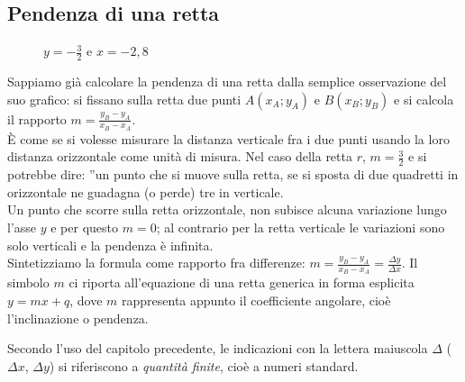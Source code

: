 \subsection{Pendenza di una retta}
\label{subsec:diff01_pendretta}

\begin{figure}[h]
\begin{inaccessibleblock}
 \begin{center}
 \begin{minipage}[]{.31 \textwidth}
  \rettadueterzi
  \caption{$y=\frac{3}{2}x-1$}
 \end{minipage} 
 \begin{minipage}[]{.31 \textwidth}
  \rettamenounquarto
  \caption{$y=-\frac{1}{4}x+\frac{1}{2}$}
 \end{minipage} 
 \begin{minipage}[]{.31 \textwidth}
  \retteorvert
  \caption{$y=-\frac{3}{2}$ e $x=-2,8$}
 \end{minipage}
 \end{center}
\end{inaccessibleblock}
\label{fig:diff01_ret}
\end{figure}


Sappiamo già calcolare la pendenza di una retta dalla semplice osservazione 
del suo grafico: si fissano sulla retta due punti $A(x_A; y_A)$ e $B(x_B; 
y_B)$
e si calcola il rapporto $m=\frac{y_B-y_A}{x_B-x_A}$.\\
È come se si volesse misurare la distanza verticale
fra i due punti usando la loro distanza orizzontale come unità di misura. 
Nel caso della retta $r$, $m=\frac{3}{2}$ e si potrebbe dire: ''un punto che 
si 
muove sulla retta, se si sposta di due quadretti in orizzontale
ne guadagna (o perde) tre in verticale.\\
Un punto che scorre sulla retta orizzontale, non subisce
alcuna variazione lungo l'asse $y$ e per questo $m=0$; al contrario per la
retta verticale le variazioni sono solo verticali e la pendenza è
infinita.\\
Sintetizziamo la formula come rapporto fra differenze:
$m=\frac{y_B-y_A}{x_B-x_A}=\frac{\Delta y}{\Delta x}$. Il simbolo $m$ 
ci riporta all'equazione di una retta generica in forma esplicita
$y=mx+q$, dove $m$ rappresenta appunto il coefficiente angolare, cioè 
l'inclinazione o pendenza.
\begin{osservazione}
Secondo l'uso del capitolo precedente, le indicazioni con la lettera
maiuscola $\Delta$ ($\Delta x$, $\Delta y$) si riferiscono a \emph{quantità 
finite},
cioè a numeri standard.
\end{osservazione}

